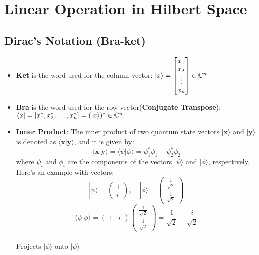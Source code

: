 \documentclass{report}
\begin{document}


\section{Linear Operation in Hilbert Space}
\subsection{Dirac's Notation (Bra-ket)}
\begin{itemize}
    \item \textbf{Ket} is the word used for the column vector: $\ket{x} = \begin{bmatrix}
        x_{1} \\
        x_{2} \\
        \vdots \\
        x_{n}
    \end{bmatrix} \in \mathbb{C}^{n}$

    \item \textbf{Bra} is the word used for the row vector(\textbf{Conjugate Transpose}): $\bra{x} = [x_{1}^*, x_{2}^*, \dots, x_{n}^*] = (\ket{x})^* \in \mathbb{C}^n$
    
\item \textbf{Inner Product}: The inner product of two quantum state vectors \(|\mathbf{x}\rangle\) and \(|\mathbf{y}\rangle\) is denoted as \(\langle \mathbf{x} | \mathbf{y} \rangle\), and it is given by:
\[ \langle \mathbf{x} | \mathbf{y} \rangle = \langle \psi | \phi \rangle = \psi_1^* \phi_1 + \psi_2^* \phi_2 \]
where \(\psi_i\) and \(\phi_i\) are the components of the vectors \(|\psi\rangle\) and \(|\phi\rangle\), respectively. Here's an example with vectors:
\[
|\psi\rangle = \begin{pmatrix} 1 \\ i \end{pmatrix}, \quad |\phi\rangle = \begin{pmatrix} \frac{1}{\sqrt{2}} \\ \frac{1}{\sqrt{2}} \end{pmatrix}
\]
\[
\langle \psi | \phi \rangle = \begin{pmatrix} 1 & i \end{pmatrix} \begin{pmatrix} \frac{1}{\sqrt{2}} \\ \frac{1}{\sqrt{2}} \end{pmatrix} = \frac{1}{\sqrt{2}} + \frac{i}{\sqrt{2}}
\] \\
Projects $| \phi \rangle$ onto $| \psi \rangle$


\end{itemize}
\end{document}
